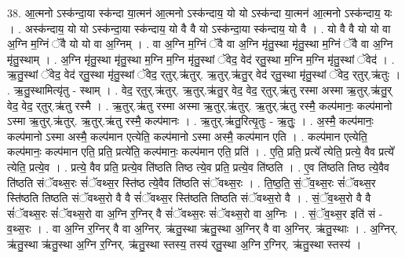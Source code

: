 \documentclass[17pt]{extarticle}
\begin{document}
38. आ॒त्मनो ऽस्क॑न्दा॒या स्क॑न्दा या॒त्मन॑ आ॒त्मनो ऽस्क॑न्दाय॒ यो यो ऽस्क॑न्दा या॒त्मन॑ आ॒त्मनो ऽस्क॑न्दाय॒ यः । . अस्क॑न्दाय॒ यो यो ऽस्क॑न्दा॒या स्क॑न्दाय॒ यो वै वै यो ऽस्क॑न्दा॒या स्क॑न्दाय॒ यो वै । . यो वै वै यो यो वा अ॒ग्नि म॒ग्निं ॅवै यो यो वा अ॒ग्निम् । . वा अ॒ग्नि म॒ग्निं ॅवै वा अ॒ग्नि मृ॑तु॒स्था मृ॑तु॒स्था म॒ग्निं ॅवै वा अ॒ग्नि मृ॑तु॒स्थाम् । . अ॒ग्नि मृ॑तु॒स्था मृ॑तु॒स्था म॒ग्नि म॒ग्नि मृ॑तु॒स्थां ॅवेद॒ वेद॑ र्‌तु॒स्था म॒ग्नि म॒ग्नि मृ॑तु॒स्थां ॅवेद॑ । . ऋ॒तु॒स्थां ॅवेद॒ वेद॑ र्‌तु॒स्था मृ॑तु॒स्थां ॅवेद॒ र्‌तुर्.ऋ॑तुर्. ऋ॒तुर्.ऋ॑तु॒र् वेद॑  र्‌तु॒स्था मृ॑तु॒स्थां ॅवेद॒ र्‌तुर्.ऋ॑तुः । . ऋ॒तु॒स्थामित्यृ॑तु - स्थाम् । . वेद॒ र्‌तुर्.ऋ॑तुर्. ऋ॒तुर्.ऋ॑तु॒र् वेद॒ वेद॒ र्‌तुर्.ऋ॑तु रस्मा अस्मा ऋ॒तुर्.ऋ॑तु॒र् वेद॒ वेद॒ र्‌तुर्.ऋ॑तु रस्मै । . ऋ॒तुर्.ऋ॑तु रस्मा अस्मा ऋ॒तुर्.ऋ॑तुर्. ऋ॒तुर्.ऋ॑तु रस्मै॒ कल्प॑मानः॒ कल्प॑मानो ऽस्मा ऋ॒तुर्.ऋ॑तुर्. ऋ॒तुर्.ऋ॑तु रस्मै॒ कल्प॑मानः । . ऋ॒तुर्.ऋ॑तु॒रित्यृ॒तुः - ऋ॒तुः॒ । . अ॒स्मै॒ कल्प॑मानः॒ कल्प॑मानो ऽस्मा अस्मै॒ कल्प॑मान एत्येति॒ कल्प॑मानो ऽस्मा अस्मै॒ कल्प॑मान एति । . कल्प॑मान एत्येति॒ कल्प॑मानः॒ कल्प॑मान एति॒ प्रति॒ प्रत्ये॑ति॒ कल्प॑मानः॒ कल्प॑मान एति॒ प्रति॑ । . ए॒ति॒ प्रति॒ प्रत्ये᳚ त्येति॒ प्रत्ये॒ वैव प्रत्ये᳚ त्येति॒ प्रत्ये॒व । . प्रत्ये॒ वैव प्रति॒ प्रत्ये॒व ति॑ष्ठति तिष्ठ त्ये॒व प्रति॒ प्रत्ये॒व ति॑ष्ठति । . ए॒व ति॑ष्ठति तिष्ठ त्ये॒वैव ति॑ष्ठति संॅवथ्स॒रः सं॑ॅवथ्स॒र स्ति॑ष्ठ त्ये॒वैव ति॑ष्ठति संॅवथ्स॒रः । . ति॒ष्ठ॒ति॒ सं॒ॅव॒थ्स॒रः सं॑ॅवथ्स॒र स्ति॑ष्ठति तिष्ठति संॅवथ्स॒रो वै वै सं॑ॅवथ्स॒र स्ति॑ष्ठति तिष्ठति संॅवथ्स॒रो वै । . सं॒ॅव॒थ्स॒रो वै वै सं॑ॅवथ्स॒रः सं॑ॅवथ्स॒रो वा अ॒ग्नि र॒ग्निर् वै सं॑ॅवथ्स॒रः सं॑ॅवथ्स॒रो वा अ॒ग्निः । . सं॒ॅव॒थ्स॒र इति॑ सं - व॒थ्स॒रः । . वा अ॒ग्नि र॒ग्निर् वै वा अ॒ग्निर्. ऋ॑तु॒स्था ऋ॑तु॒स्था अ॒ग्निर् वै वा अ॒ग्निर्. ऋ॑तु॒स्थाः । . अ॒ग्निर्. ऋ॑तु॒स्था ऋ॑तु॒स्था अ॒ग्नि र॒ग्निर्. ऋ॑तु॒स्था स्तस्य॒ तस्य॑ र्‌तु॒स्था अ॒ग्नि र॒ग्निर्. ऋ॑तु॒स्था स्तस्य॑ । \newline
\pagebreak
{}
\end{document}
